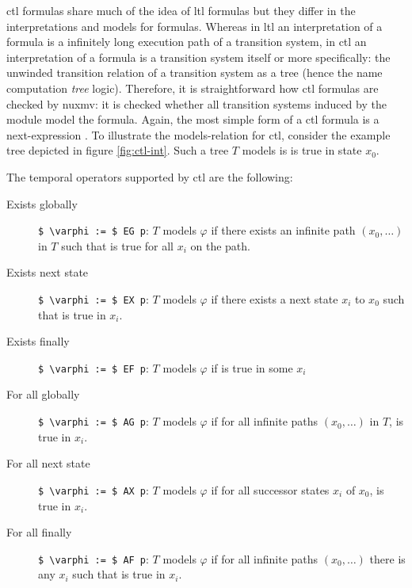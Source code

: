 
\gls{ctl} formulas share much of the idea of \gls{ltl} formulas but they differ in the interpretations and models for formulas.
Whereas in \gls{ltl} an interpretation of a formula is a infinitely long execution path of a transition system, in \gls{ctl} an interpretation of a formula is a transition system itself or more specifically: the unwinded transition relation of a transition system as a tree (hence the name computation \textit{tree} logic).
Therefore, it is straightforward how \gls{ctl} formulas are checked by \gls{nuxmv}: it is checked whether all transition systems induced by the module model the formula.
Again, the most simple form of a \gls{ctl} formula is a next-expression .
To illustrate the models-relation for \gls{ctl}, consider the example tree depicted in figure \ref{fig:ctl-int}.
Such a tree $ T $ models  is  is true in state $ x_0 $.

The temporal operators supported by \gls{ctl} are the following:
\begin{description}
    \item[Exists globally] \lstinline[language=smv,mathescape=true]{$ \varphi := $ EG p}: $ T $ models $ \varphi $ if there exists an infinite path $ (x_0, \dots) $ in $ T $ such that  is true for all $ x_i $ on the path.
    \item[Exists next state] \lstinline[language=smv,mathescape=true]{$ \varphi := $ EX p}: $ T $ models $ \varphi $ if there exists a next state $ x_i $ to $ x_0 $ such that  is true in $ x_i $.
    \item[Exists finally] \lstinline[language=smv,mathescape=true]{$ \varphi := $ EF p}: $ T $ models $ \varphi $ if  is true in some $ x_i $
    \item[For all globally] \lstinline[language=smv,mathescape=true]{$ \varphi := $ AG p}: $ T $ models $ \varphi $ if for all infinite paths $ (x_0, \dots) $ in $ T $,  is true in $ x_i $.
    \item[For all next state] \lstinline[language=smv,mathescape=true]{$ \varphi := $ AX p}: $ T $ models $ \varphi $ if for all successor states $ x_i $ of $ x_0 $,  is true in $ x_i $.
    \item[For all finally] \lstinline[language=smv,mathescape=true]{$ \varphi := $ AF p}: $ T $ models $ \varphi $ if for all infinite paths $ (x_0, \dots) $ there is any $ x_i $ such that  is true in $ x_i $.
\end{description}

